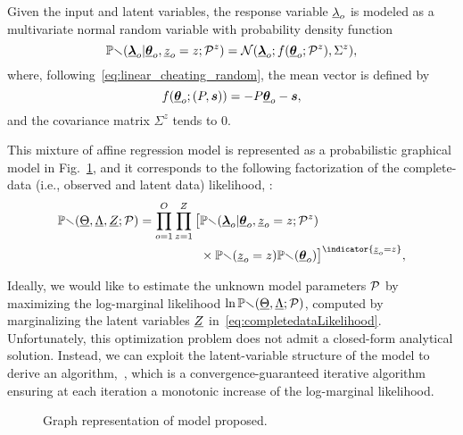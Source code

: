 \documentclass{ifacconf}  %
\begin{document}
Given the input and latent variables, the response variable $\underline{\lambda}_{o}$ is modeled as a multivariate normal random variable with probability density function
\begin{equation}
  \label{eq:multivariate_gaussian}
\mathbb{Pr}({\underline{\boldsymbol{\lambda}}}_{o}|{\underline{\boldsymbol{\theta}}}_{o},\underline{z}_{o}=z; \mathcal{P}^{z}) = \mathcal{N}({\underline{\boldsymbol{\lambda}}}_{o};f({\underline{\boldsymbol{\theta}}}_{o};\mathcal{P}^{z}),{\Sigma^{z}}),
\end{equation}
where, following~\eqref{eq:linear_cheating_random}, the mean vector is defined by
\[f({\underline{\boldsymbol{\theta}}}_{o};(P,\boldsymbol{s}))=-{P}{\underline{\boldsymbol{\theta}}}_{o}-{\boldsymbol{s}},\]
and the covariance matrix ${\Sigma^{z}}$ tends to $0$.

This mixture of affine regression model is represented as a probabilistic graphical model in Fig.~\ref{fig:model}, and it corresponds to the following factorization of the complete-data (i.e., observed and latent data) likelihood, \cite{Bishop2006}:
\begin{align}\label{eq:completedataLikelihood}
  \probability{\random{\Theta},\random{\Lambda},\random{Z};\set{P}}= \prod_{o=1}^{O}\prod_{z=1}^{Z}\big[&\probability{\randomvec{\lambda}_{o}|\randomvec{\theta}_{o},\random{z}_{o}=z;\set{P}^{z}} \nonumber \\
& \times \probability{\random{z}_{o}=z}\probability{\randomvec{\theta}_{o}}\big]^{\indicator{\random{z}_{o}=z}},
\end{align}

Ideally, we would like to estimate the unknown model parameters $\mathcal{P}$ by maximizing the log-marginal likelihood $\ln \mathbb{Pr}(\underline{\Theta},\underline{\Lambda};\mathcal{P})$, computed by marginalizing the latent variables $\underline{Z}$ in~\eqref{eq:completedataLikelihood}.
Unfortunately, this optimization problem does not admit a closed-form analytical solution.
Instead, we can exploit the latent-variable structure of the model to derive an \EM{} algorithm,~\cite{DempsterEtAl1977}, which is a convergence-guaranteed iterative algorithm ensuring at each iteration a monotonic increase of the log-marginal likelihood.

\begin{figure}[b]
  \centering
  \caption{Graph representation of model proposed.}\label{fig:model}
\end{figure}
\end{document}
